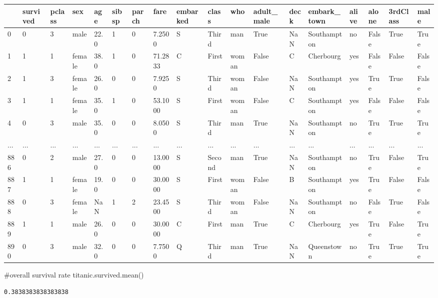 \documentclass[
  letterpaper,
  DIV=11,
  numbers=noendperiod]{scrreprt}
\newenvironment{Shaded}{\begin{snugshade}}{\end{snugshade}}
\newcommand{\CommentTok}[1]{\textcolor[rgb]{0.37,0.37,0.37}{#1}}
\newcommand{\NormalTok}[1]{\textcolor[rgb]{0.00,0.23,0.31}{#1}}
\begin{document}
\begin{longtable}[]{@{}llllllllllllllllll@{}}
\toprule()
& survived & pclass & sex & age & sibsp & parch & fare & embarked &
class & who & adult\_male & deck & embark\_town & alive & alone &
3rdClass & male \\
\midrule()
\endhead
0 & 0 & 3 & male & 22.0 & 1 & 0 & 7.2500 & S & Third & man & True & NaN
& Southampton & no & False & True & True \\
1 & 1 & 1 & female & 38.0 & 1 & 0 & 71.2833 & C & First & woman & False
& C & Cherbourg & yes & False & False & False \\
2 & 1 & 3 & female & 26.0 & 0 & 0 & 7.9250 & S & Third & woman & False &
NaN & Southampton & yes & True & True & False \\
3 & 1 & 1 & female & 35.0 & 1 & 0 & 53.1000 & S & First & woman & False
& C & Southampton & yes & False & False & False \\
4 & 0 & 3 & male & 35.0 & 0 & 0 & 8.0500 & S & Third & man & True & NaN
& Southampton & no & True & True & True \\
... & ... & ... & ... & ... & ... & ... & ... & ... & ... & ... & ... &
... & ... & ... & ... & ... & ... \\
886 & 0 & 2 & male & 27.0 & 0 & 0 & 13.0000 & S & Second & man & True &
NaN & Southampton & no & True & False & True \\
887 & 1 & 1 & female & 19.0 & 0 & 0 & 30.0000 & S & First & woman &
False & B & Southampton & yes & True & False & False \\
888 & 0 & 3 & female & NaN & 1 & 2 & 23.4500 & S & Third & woman & False
& NaN & Southampton & no & False & True & False \\
889 & 1 & 1 & male & 26.0 & 0 & 0 & 30.0000 & C & First & man & True & C
& Cherbourg & yes & True & False & True \\
890 & 0 & 3 & male & 32.0 & 0 & 0 & 7.7500 & Q & Third & man & True &
NaN & Queenstown & no & True & True & True \\
\bottomrule()
\end{longtable}

\begin{Shaded}
\begin{Highlighting}[]
\CommentTok{\#overall survival rate}
\NormalTok{titanic.survived.mean()}
\end{Highlighting}
\end{Shaded}

\begin{verbatim}
0.3838383838383838
\end{verbatim}
\end{document}
